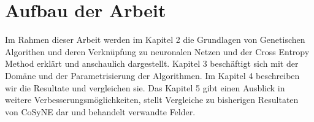 \section{Aufbau der Arbeit}

Im Rahmen dieser Arbeit werden im Kapitel 2 die Grundlagen von Genetischen Algorithen und deren Verknüpfung zu neuronalen Netzen und der Cross Entropy Method erklärt und anschaulich dargestellt. Kapitel 3 beschäftigt sich mit der Domäne und der Parametrisierung der Algorithmen. Im Kapitel 4 beschreiben wir die Resultate und vergleichen sie. Das Kapitel 5 gibt einen Ausblick in weitere Verbesserungsmöglichkeiten, stellt Vergleiche zu bisherigen Resultaten von CoSyNE dar und behandelt verwandte Felder.